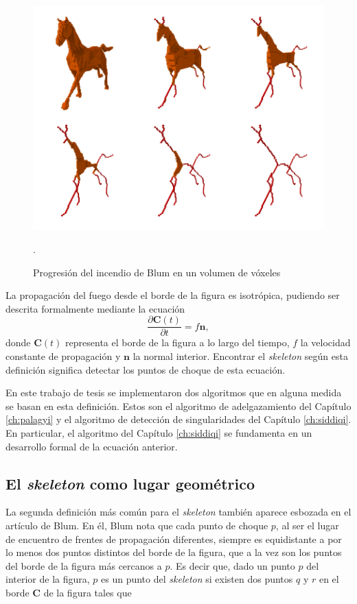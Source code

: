 \begin{figure}[ht]\centering
\includegraphics[width=0.9\linewidth]{images/fire_in_the_horse}
\caption{Progresión del incendio de Blum en un volumen de vóxeles}.
\label{fig:fireinthehorse}
\end{figure}

La propagación del fuego desde el borde de la figura es isotrópica, pudiendo ser descrita formalmente mediante la ecuación
\begin{equation} \label{eq:curve_evol}
\frac{\partial{\boldsymbol{C}(t)}}{\partial{t}} = f\boldsymbol{n},
\end{equation}
donde $\boldsymbol{C}(t)$ representa el borde de la figura a lo largo del tiempo, $f$ la velocidad constante de propagación y $\boldsymbol{n}$ la normal interior. Encontrar el \textit{skeleton} según esta definición significa detectar los puntos de choque de esta ecuación.

En este trabajo de tesis se implementaron dos algoritmos que en alguna medida se basan en esta definición. Estos son el algoritmo de adelgazamiento del Capítulo \ref{ch:palagyi} y el algoritmo de detección de singularidades del Capítulo \ref{ch:siddiqi}. En particular, el algoritmo del Capítulo \ref{ch:siddiqi} se fundamenta en un desarrollo formal de la ecuación anterior.

\subsection{El \textit{skeleton} como lugar geométrico}

La segunda definición más común para el \textit{skeleton} también aparece esbozada en el artículo de Blum. En él, Blum nota que cada punto de choque $p$, al ser el lugar de encuentro de frentes de propagación diferentes, siempre es equidistante a por lo menos dos puntos distintos del borde de la figura, que a la vez son los puntos del borde de la figura más cercanos a $p$. Es decir que, dado un punto $p$ del interior de la figura, $p$ es un punto del \textit{skeleton} si existen dos puntos $q$ y $r$ en el  borde $\boldsymbol{C}$ de la figura tales que

